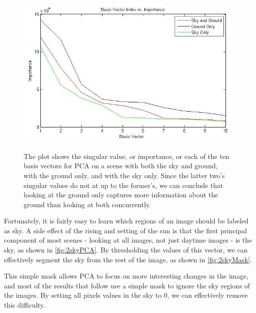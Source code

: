 \begin{figure}[t]
	\centering
		\includegraphics[width=.7\textwidth]{figures/skyMaskFig.jpg}
	\label{fig:skyMaskFig}
	
		\caption[Singular values of scenes with and without the sky.]{The plot shows the singular value, or importance, or each of the ten basis vectors for PCA on a scene with both the sky and ground, with the ground only, and with the sky only.  Since the latter two's singular values do not at up to the former's, we can conclude that looking at the ground only captures more information about the ground than looking at both concurrently.}
\end{figure}

Fortunately, it is fairly easy to learn which regions of an image should be labeled as sky.  A side effect of the rising and setting of the sun is that the first principal component of most scenes - looking at all images, not just daytime images - is the sky, as shown in \ref{fig:2skyPCA}.  By thresholding the values of this vector, we can effectively segment the sky from the rest of the image, as shown in \ref{fig:2skyMask}.

This simple mask allows PCA to focus on more interesting changes in the image, and most of the results that follow use a simple mask to ignore the sky regions of the images.  By setting all pixels values in the sky to 0, we can effectively remove this difficulty.


